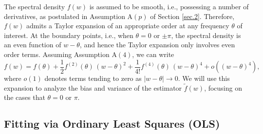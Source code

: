 \documentclass[12p E.Lt,psfig]{article} %
\def\tends{\rightarrow}
\begin{document}
The spectral density $f( w)$ is assumed to be smooth, i.e., possessing a number of
derivatives, as postulated in  Assumption A$(p)$ of  Section \ref{sec.2}.
Therefore,  $f( w)$  admits a Taylor expansion of an appropriate order
 at any  frequency $\theta $  of interest.
At the boundary points, i.e., when
   $\theta = 0$ or $ \pm \pi$, the spectral density is an even function of $w -  \theta $, and hence
 the Taylor expansion only involves even order terms. Assuming   Assumption A$(4)$,
 we can write
 \begin{equation}
 \label{eq:spec.expand}
  f( w) = f(\theta) + \frac{1}{2 }  f^{(2)} (\theta) \, {(w -  \theta )}^2
   +   \frac{1}{4!} f^{(4)} (\theta) \, {(w -  \theta )}^4 + o ( {(w -  \theta )}^4 ),
\end{equation}
 where $o(1)$ denotes terms tending to zero as $ |w- \theta| \tends 0$.
 We will use this expansion to analyze the bias and variance of the estimator $\tilde f (w)$,
  focusing on the cases that $\theta = 0 $ or $ \pi$.
 

\subsection{Fitting via Ordinary Least Squares (OLS)}
\end{document}
